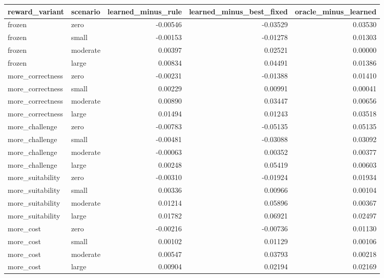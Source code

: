 \begin{tabular}{llrrr}
\toprule
reward\_variant & scenario & learned\_minus\_rule & learned\_minus\_best\_fixed & oracle\_minus\_learned \\
\midrule
frozen & zero & -0.00546 & -0.03529 & 0.03530 \\
frozen & small & -0.00153 & -0.01278 & 0.01303 \\
frozen & moderate & 0.00397 & 0.02521 & 0.00000 \\
frozen & large & 0.00834 & 0.04491 & 0.01386 \\
more\_correctness & zero & -0.00231 & -0.01388 & 0.01410 \\
more\_correctness & small & 0.00229 & 0.00991 & 0.00041 \\
more\_correctness & moderate & 0.00890 & 0.03447 & 0.00656 \\
more\_correctness & large & 0.01494 & 0.01243 & 0.03518 \\
more\_challenge & zero & -0.00783 & -0.05135 & 0.05135 \\
more\_challenge & small & -0.00481 & -0.03088 & 0.03092 \\
more\_challenge & moderate & -0.00063 & 0.00352 & 0.00377 \\
more\_challenge & large & 0.00248 & 0.05419 & 0.00603 \\
more\_suitability & zero & -0.00310 & -0.01924 & 0.01934 \\
more\_suitability & small & 0.00336 & 0.00966 & 0.00104 \\
more\_suitability & moderate & 0.01214 & 0.05896 & 0.00367 \\
more\_suitability & large & 0.01782 & 0.06921 & 0.02497 \\
more\_cost & zero & -0.00216 & -0.00736 & 0.01130 \\
more\_cost & small & 0.00102 & 0.01129 & 0.00106 \\
more\_cost & moderate & 0.00547 & 0.03793 & 0.00218 \\
more\_cost & large & 0.00904 & 0.02194 & 0.02169 \\
\bottomrule
\end{tabular}
